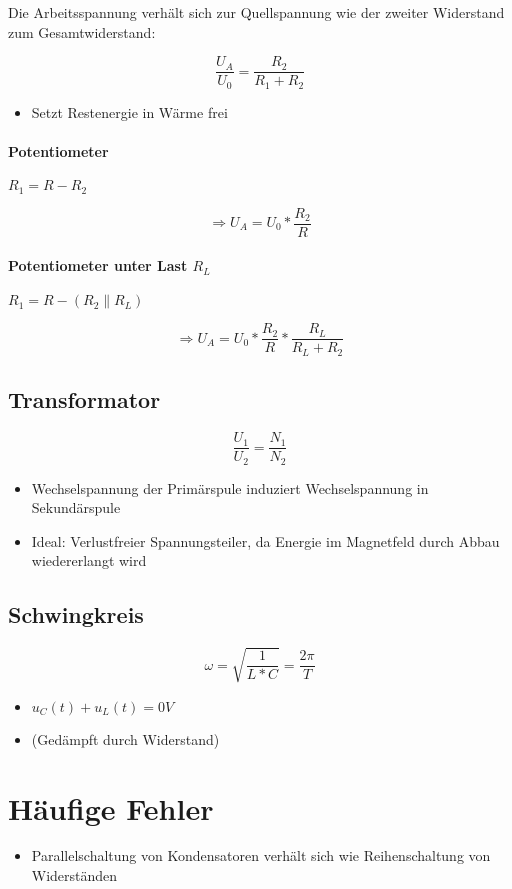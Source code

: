 Die Arbeitsspannung verhält sich zur Quellspannung wie der zweiter Widerstand zum Gesamtwiderstand:

$$\frac{U_A}{U_0} = \frac{R_2}{R_1 + R_2}$$

\begin{itemize}
  \item Setzt Restenergie in Wärme frei
\end{itemize}

\paragraph{Potentiometer} $R_1 = R - R_2$

$$\Rightarrow U_A = U_0 * \frac{R_2}{R}$$

\paragraph{Potentiometer unter Last $R_L$}
$R_1 = R - (R_2 \parallel R_L)$

$$\Rightarrow U_A = U_0 * \frac{R_2}{R} * \frac{R_L}{R_L + R_2}$$

\subsection{Transformator}

$$\frac{U_1}{U_2} = \frac{N_1}{N_2}$$

\begin{itemize}
  \item Wechselspannung der Primärspule induziert Wechselspannung in Sekundärspule
  \item Ideal: Verlustfreier Spannungsteiler, da Energie im Magnetfeld durch Abbau wiedererlangt wird
\end{itemize}

\subsection{Schwingkreis}

$$\omega = \sqrt{\frac{1}{L * C}} = \frac{2\pi}{T}$$

\begin{itemize}
  \item $u_C(t) + u_L(t) = 0V$
  \item (Gedämpft durch Widerstand)
\end{itemize}

\section{Häufige Fehler}

\begin{itemize}
  \item Parallelschaltung von Kondensatoren verhält sich wie Reihenschaltung von Widerständen
\end{itemize}